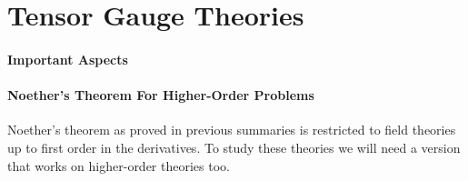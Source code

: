 \section{Tensor Gauge Theories}

\paragraph{Important Aspects}

\paragraph{Noether's Theorem For Higher-Order Problems}
Noether's theorem as proved in previous summaries is restricted to field theories up to first order in the derivatives. To study these theories we will need a version that works on higher-order theories too.

